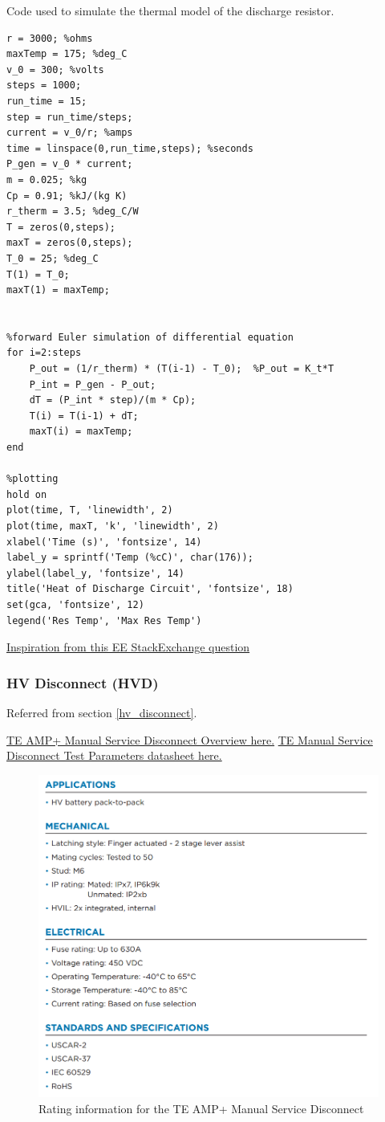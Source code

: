\documentclass{article}
\begin{document}
Code used to simulate the thermal model of the discharge resistor.
\begin{lstlisting}
r = 3000; %ohms
maxTemp = 175; %deg_C
v_0 = 300; %volts
steps = 1000;
run_time = 15;
step = run_time/steps;
current = v_0/r; %amps
time = linspace(0,run_time,steps); %seconds
P_gen = v_0 * current;
m = 0.025; %kg
Cp = 0.91; %kJ/(kg K)
r_therm = 3.5; %deg_C/W
T = zeros(0,steps);
maxT = zeros(0,steps);
T_0 = 25; %deg_C
T(1) = T_0;
maxT(1) = maxTemp;
 

%forward Euler simulation of differential equation
for i=2:steps
    P_out = (1/r_therm) * (T(i-1) - T_0);  %P_out = K_t*T
    P_int = P_gen - P_out;
    dT = (P_int * step)/(m * Cp);
    T(i) = T(i-1) + dT;
    maxT(i) = maxTemp;
end

%plotting
hold on
plot(time, T, 'linewidth', 2)
plot(time, maxT, 'k', 'linewidth', 2)
xlabel('Time (s)', 'fontsize', 14)
label_y = sprintf('Temp (%cC)', char(176));
ylabel(label_y, 'fontsize', 14)
title('Heat of Discharge Circuit', 'fontsize', 18)
set(gca, 'fontsize', 12)
legend('Res Temp', 'Max Res Temp')
\end{lstlisting}

\href{http://electronics.stackexchange.com/questions/161011/mathematical-model-of-the-temperature-of-resistors-heatsinks}{Inspiration from this EE StackExchange question}


\subsubsection{HV Disconnect (HVD)}\label{appendix_hvd}
Referred from section \ref{hv_disconnect}.

\href{http://www.te.com/content/dam/te-com/documents/hybrid-and-electric-mobility-solutions/global/8-1773462-2-msd.pdf}{TE AMP+ Manual Service Disconnect Overview here.}
\href{http://www.te.com/commerce/DocumentDelivery/DDEController?Action=showdoc&DocId=Specification+Or+Standard%7F108-127000%7FA%7Fpdf%7FEnglish%7FENG_SS_108-127000_A.pdf%7FN-A}{TE Manual Service Disconnect Test Parameters datasheet here.}
	
\begin{figure}[H]
	\includegraphics[width=0.7\linewidth]{MSD_Ratings.png}
	\caption{Rating information for the TE AMP+ Manual Service Disconnect}
\end{figure}
\end{document}

